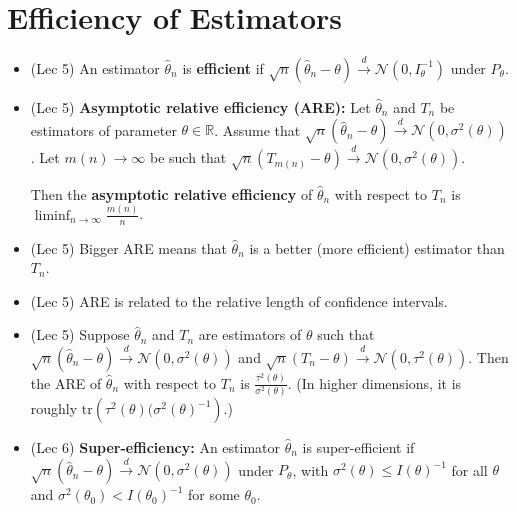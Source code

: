 \documentclass[twoside]{article}
\newcommand{\dis}{\displaystyle}
\newcommand\bbR{\mathbb{R}}
\newcommand\calN{\mathcal{N}}
\newcommand\sg{\sigma}
\def\t{\theta}
\newcommand\cd{\stackrel{d}{\goesto}}
\newcommand\goesto{\rightarrow}
\begin{document}
\section{Efficiency of Estimators}
\begin{itemize}
\item (Lec 5) An estimator $\hat{\t}_n$ is \textbf{efficient} if $\sqrt{n}(\hat{\t}_n - \t) \cd \calN(0, I_\t^{-1})$ under $P_\t$.

\item (Lec 5) \textbf{Asymptotic relative efficiency (ARE):} Let $\hat{\theta}_n$ and $T_n$ be estimators of parameter $\theta \in \bbR$. Assume that 
$\sqrt{n}(\hat{\theta}_n - \theta) \cd \calN(0,\sigma^2(\theta))$. Let $m(n) \goesto \infty$ be such that $\sqrt{n}(T_{m(n)} - \theta)\cd \calN(0,\sigma^2(\theta))$.

Then the \textbf{asymptotic relative efficiency} of $\hat{\theta}_n$ with respect to $T_n$ is $\dis\liminf_{n \goesto \infty}\frac{m(n)}{n}$.

\item (Lec 5) Bigger ARE means that $\hat{\t}_n$ is a better (more efficient) estimator than $T_n$.

\item (Lec 5) ARE is related to the relative length of confidence intervals.

\item (Lec 5) Suppose $\hat{\theta}_n$ and $T_n$ are estimators of $\theta$ such that
$\sqrt{n}(\hat{\theta}_n - \theta)\cd \calN(0, \sigma^2(\theta))$ and
$\sqrt{n}(T_n - \theta)\cd \calN(0, \tau^2(\theta))$. Then the ARE of $\hat{\theta}_n$ with respect to $T_n$ is $\dis\frac{\tau^2(\theta)}{\sigma^2(\theta)}$. (In higher dimensions, it is roughly $\text{tr}\left(\tau^2(\theta)(\sigma^2(\theta)^{-1}\right)$.)

\item (Lec 6) \textbf{Super-efficiency:} An estimator $\hat{\t}_n$ is super-efficient if $\sqrt{n}(\hat{\t}_n - \t) \cd \calN(0, \sg^2(\t))$ under $P_\t$, with $\sg^2(\t) \leq I(\t)^{-1}$ for all $\t$ and $\sg^2(\t_0) < I(\t_0)^{-1}$ for some $\t_0$.

\end{itemize}

\end{document}

